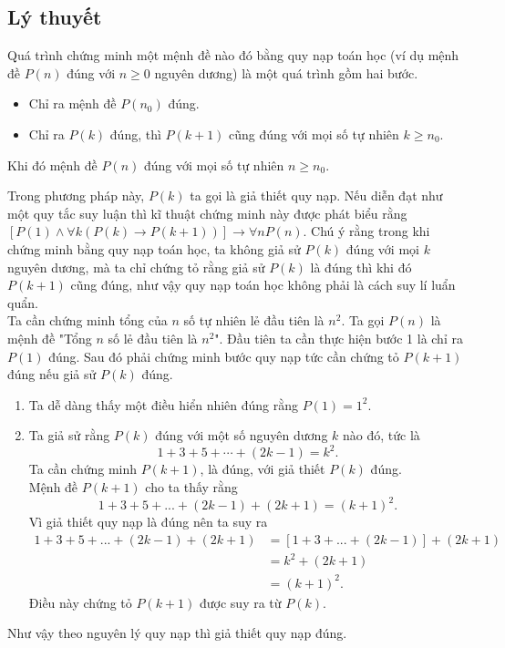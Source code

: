 \subsection*{Lý thuyết}
\begin{dx}
Quá trình chứng minh một mệnh đề nào đó bằng quy nạp toán học (ví dụ mệnh đề $P(n)$ đúng với $n\ge 0$ nguyên dương) là một quá trình gồm hai bước.
	\begin{itemize}
		\item {} Chỉ ra mệnh đề $P(n_0)$ đúng.
		\item {} Chỉ ra $P(k)$ đúng, thì $P(k+1)$ cũng đúng với mọi số tự nhiên $k\ge {{n}_{0}}$.
	\end{itemize}
	Khi đó mệnh đề $P(n)$ đúng với mọi số tự nhiên $n\ge {{n}_{0}}$. 
\end{dx}
Trong phương pháp này, $P(k)$ ta gọi là giả thiết quy nạp. Nếu diễn đạt như một quy tắc suy luận thì kĩ thuật chứng minh này được phát biểu rằng
$\left[ {P\left( 1 \right) \wedge \forall k\left( {P\left( k \right) \to P\left( {k + 1} \right)} \right)} \right] \to \forall nP\left( n \right)$.
Chú ý rằng trong khi chứng minh bằng quy nạp toán học, ta không giả sử $P(k)$ đúng với mọi $k$ nguyên dương, mà ta chỉ chứng tỏ rằng giả sử $P(k)$ là đúng thì khi đó $P(k+1)$ cũng đúng, như vậy quy nạp toán học không phải là cách suy lí luẩn quẩn.\\


 Ta cần chứng minh tổng của $n$ số tự nhiên lẻ đầu tiên là $n^2$. Ta gọi $P(n)$ là mệnh đề "Tổng $n$ số lẻ đầu tiên là $n^2$". Đầu tiên ta cần thực hiện bước 1 là chỉ ra $P(1)$ đúng. Sau đó phải chứng minh bước quy nạp tức cần chứng tỏ $P(k+1)$ đúng nếu giả sử $P(k)$ đúng.
\begin{enumerate}
	\item Ta dễ dàng thấy một điều hiển nhiên đúng rằng $P(1)=1^2.$
	\item Ta giả sử rằng $P(k)$ đúng với một số nguyên dương $k$ nào đó, tức là
	$$1+3+5+\cdots+(2k-1)=k^2.$$
	Ta cần chứng minh $P(k+1)$, là đúng, với giả thiết $P(k)$ đúng. \\
	Mệnh đề $P(k+1)$ cho ta thấy rằng 
	\[1+3+5+...+(2k-1)+(2k+1)=(k+1)^2.\]
	Vì giả thiết quy nạp là đúng nên ta suy ra
	\begin{align*}
		1+3+5+...+(2k-1)+(2k+1)&=[1+3+...+(2k-1)]+(2k+1)
		\\&=k^2+(2k+1)\\&=(k+1)^2.
	\end{align*}
	Điều này chứng tỏ $P(k+1)$ được suy ra từ $P(k)$.
\end{enumerate}
Như vậy theo nguyên lý quy nạp thì giả thiết quy nạp đúng. \\

